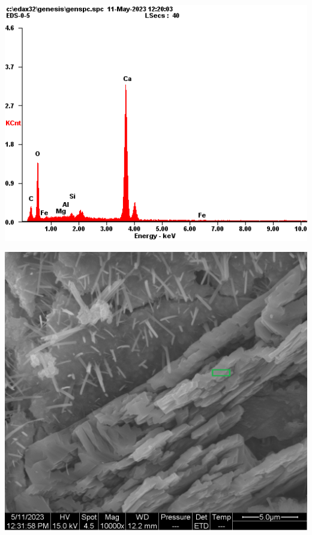 \begin{minipage}{\textwidth}
  \begin{minipage}[b]{0.32\textwidth}
    \centering
    \includegraphics[width = \linewidth]{assets/spectrum/00-05-10000x-ETD-CH.png}
  \end{minipage}
  \hfill
  \begin{minipage}[b]{0.32\textwidth}
    \centering
    \includegraphics[width = \linewidth]{assets/spectrum selection/00-05-10000x-ETD-CH.png}
    \label{fig:00-05-select}
  \end{minipage}
  \hfill
  \begin{minipage}[b]{0.32\textwidth}
    \centering
    \begin{tabular}{|c|c|c|}
      \hline


\end{tabular}
\end{minipage}
\end{minipage}
